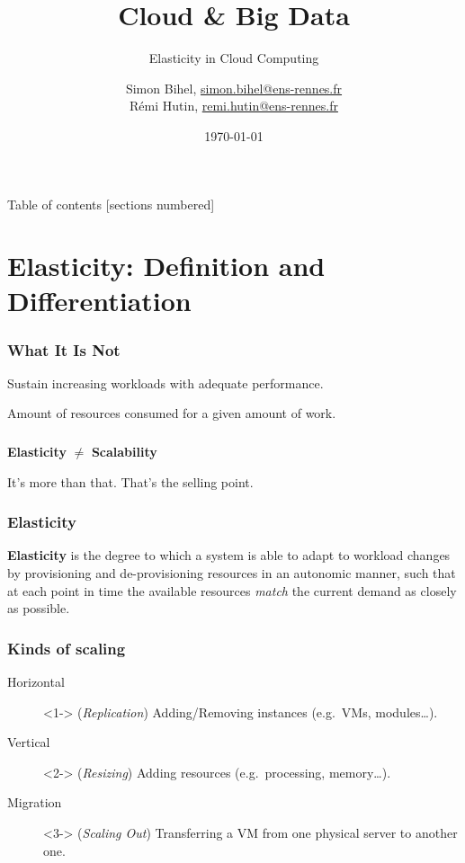 \documentclass{beamer}
\title{Cloud \& Big Data}
\subtitle{Elasticity in Cloud Computing}
\date{\today}
\author{%
  Simon Bihel, \url{simon.bihel@ens-rennes.fr} \\
  Rémi Hutin, \url{remi.hutin@ens-rennes.fr}
}
\institute{%
  University of Rennes I \\
  École normale supérieure de Rennes
}
\begin{document}
\maketitle

\begin{frame}{Table of contents}
  [sections numbered]
  \tableofcontents[hideallsubsections]
\end{frame}


\section{Elasticity: Definition and Differentiation}
\begin{frame}
  \frametitle{What It Is Not~\cite{herbst2013elasticity}}
  \begin{description}
    \parbox{\linewidth}{%
    \item[Scalability] Sustain increasing workloads with adequate performance.
    \item[Efficiency] Amount of resources consumed for a given amount of work.
    }
  \end{description}
\end{frame}


\begin{frame}
  \frametitle{}
  \centering
  \Large\textbf{Elasticity} $\neq$ \textbf{Scalability}

  \pause{}
  It's more than that. That's the selling point.
\end{frame}

\begin{frame}
  \frametitle{Elasticity~\cite{herbst2013elasticity}~\cite{galante2012survey}~\cite{gulati2011cloud}}
  \begin{definition}
  \parbox{\linewidth}{\textbf{Elasticity} is the degree to which a system is able to adapt to workload changes by provisioning and de-provisioning resources in an autonomic manner, such that at each point in time the available resources \textit{match} the current demand as closely as possible.}
  \end{definition}
\end{frame}

\begin{frame}
  \frametitle{Kinds of scaling}
  \begin{description}
    \item[Horizontal]<1-> (\textit{Replication}) Adding/Removing instances (e.g.\ VMs, modules\dots).
    \item[Vertical]<2-> (\textit{Resizing}) Adding resources (e.g.\ processing, memory\dots).
    \item[Migration]<3-> (\textit{Scaling Out}) Transferring a VM from one physical server to another one.
  \end{description}
\end{frame}
\end{document}
